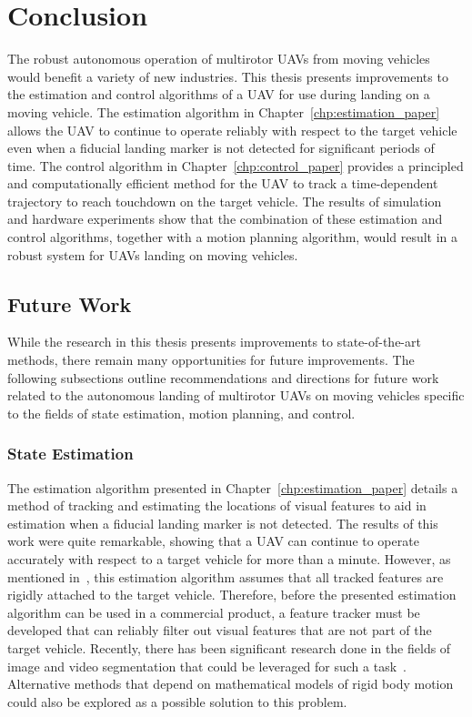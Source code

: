 
\chapter{Conclusion}
\label{chp:conclusion}

The robust autonomous operation of multirotor UAVs from moving vehicles would benefit a
variety of new industries.
This
thesis presents improvements to the estimation and control algorithms of a UAV
for use during landing on a moving vehicle. The estimation algorithm in
Chapter~\ref{chp:estimation_paper}
allows the UAV to continue to operate reliably with respect to the target vehicle
even when a fiducial landing marker is not detected for significant
periods of time.
The control algorithm in Chapter~\ref{chp:control_paper} provides a principled
and computationally efficient method for the UAV to track a time-dependent
trajectory to reach touchdown on the target vehicle. The results of simulation and hardware
experiments show that the combination of these estimation and control
algorithms, together with a motion planning algorithm, would result in a robust
system for UAVs landing on moving vehicles.

\section{Future Work}
\label{sec:future_work}
While the research in this thesis presents improvements to 
state-of-the-art methods, there remain many opportunities for future
improvements.
The following subsections outline
recommendations and directions for future work related to the autonomous
landing of multirotor UAVs on moving vehicles specific to the fields of state
estimation, motion planning, and control.

\subsection{State Estimation}
The estimation algorithm presented in Chapter~\ref{chp:estimation_paper} details
a method of tracking and estimating the locations of visual features 
to aid in estimation when a fiducial landing marker is
not detected. The results of this work were quite remarkable, showing that a UAV
can continue to operate accurately with respect to a target vehicle for more
than a minute. However, as mentioned in~, this estimation algorithm
assumes that all tracked features are rigidly attached to the target vehicle.
Therefore, before the presented estimation algorithm can be used in a commercial
product, a feature tracker must be developed that can reliably filter out visual
features that are not part of the target vehicle.
Recently, there has been significant research done
in the fields of image and video segmentation that could be leveraged for such a
task~\cite{chen2018encoder}. Alternative methods that depend on
mathematical models of rigid body motion could also be explored as a possible
solution to this problem.

